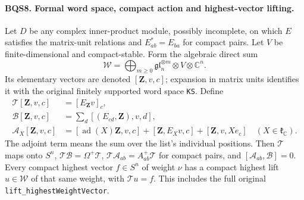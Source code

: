 \documentclass[11pt,a4paper]{article}
\numberwithin{equation}{section}
\theoremstyle{remark}\newtheorem{remark}[theorem]{Remark}
\begin{document}
\paragraph{BQS8. Formal word space, compact action and highest-vector lifting.}
\label{claim:BQS8}
Let $D$ be any complex inner-product module, possibly incomplete, on
which $E$ satisfies the matrix-unit relations and
$E_{ab}^*=E_{ba}$ for compact pairs.  Let $V$ be finite-dimensional
and compact-stable.  Form the algebraic direct sum
\[
 \mathcal W=\bigoplus_{m\ge0}
             \mathfrak{gl}_n^{\otimes m}\otimes V\otimes\mathbb C^n .
 \tag{BQS.22}
\]
Its elementary vectors are denoted $[\mathbf Z,v,c]$; expansion in
matrix units identifies it with the original finitely supported word
space \texttt{KS}.  Define
\[
\begin{aligned}
 \mathcal T[\mathbf Z,v,c]&=[E_{\mathbf Z}v]_c,\\
 \mathcal B[\mathbf Z,v,c]&=\sum_d[(E_{cd},\mathbf Z),v,d],\\
 \mathcal A_X[\mathbf Z,v,c]&=
 [\operatorname{ad}(X)\mathbf Z,v,c]+[\mathbf Z,E_Xv,c]
                 +[\mathbf Z,v,Xe_c]\quad(X\in\mathfrak k_{\mathbb C}).
\end{aligned}
\tag{BQS.23}
\]
The adjoint term means the sum over the list's individual positions.
Then $\mathcal T$ maps onto $S^n$,
$\mathcal T\mathcal B=\Omega^+\mathcal T$,
$\mathcal T\mathcal A_{ab}=A^+_{ab}\mathcal T$ for compact pairs, and
$[\mathcal A_{ab},\mathcal B]=0$.
Every compact highest vector $f\in S^n$ of weight $\nu$ has a compact
highest lift $u\in\mathcal W$ of that same weight, with $\mathcal T u=f$.
This includes the full original \texttt{lift\_\allowbreak highest\allowbreak Weight\allowbreak Vector}.
\end{document}

